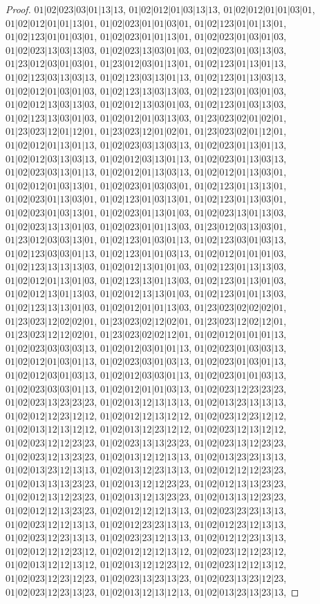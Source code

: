 \documentclass[12pt]{article}
\theoremstyle{plain}
\theoremstyle{definition}
\theoremstyle{remark}
\begin{document}
\begin{proof}
$01|02|023|03|01|13|13$, $01|02|012|01|03|13|13$, $01|02|012|01|01|03|01$, $01|02|012|01|01|13|01$, $01|02|023|01|01|03|01$, $01|02|123|01|01|13|01$, $01|02|123|01|01|03|01$, $01|02|023|01|01|13|01$, $01|02|023|01|03|01|03$, $01|02|023|13|03|13|03$, $01|02|023|13|03|01|03$, $01|02|023|01|03|13|03$, $01|23|012|03|01|03|01$, $01|23|012|03|01|13|01$, $01|02|123|01|13|01|13$, $01|02|123|03|13|03|13$, $01|02|123|03|13|01|13$, $01|02|123|01|13|03|13$, $01|02|012|01|03|01|03$, $01|02|123|13|03|13|03$, $01|02|123|01|03|01|03$, $01|02|012|13|03|13|03$, $01|02|012|13|03|01|03$, $01|02|123|01|03|13|03$, $01|02|123|13|03|01|03$, $01|02|012|01|03|13|03$, $01|23|023|02|01|02|01$, $01|23|023|12|01|12|01$, $01|23|023|12|01|02|01$, $01|23|023|02|01|12|01$, $01|02|012|01|13|01|13$, $01|02|023|03|13|03|13$, $01|02|023|01|13|01|13$, $01|02|012|03|13|03|13$, $01|02|012|03|13|01|13$, $01|02|023|01|13|03|13$, $01|02|023|03|13|01|13$, $01|02|012|01|13|03|13$, $01|02|012|01|13|03|01$, $01|02|012|01|03|13|01$, $01|02|023|01|03|03|01$, $01|02|123|01|13|13|01$, $01|02|023|01|13|03|01$, $01|02|123|01|03|13|01$, $01|02|123|01|13|03|01$, $01|02|023|01|03|13|01$, $01|02|023|01|13|01|03$, $01|02|023|13|01|13|03$, $01|02|023|13|13|01|03$, $01|02|023|01|01|13|03$, $01|23|012|03|13|03|01$, $01|23|012|03|03|13|01$, $01|02|123|01|03|01|13$, $01|02|123|03|01|03|13$, $01|02|123|03|03|01|13$, $01|02|123|01|01|03|13$, $01|02|012|01|01|01|03$, $01|02|123|13|13|13|03$, $01|02|012|13|01|01|03$, $01|02|123|01|13|13|03$, $01|02|012|01|13|01|03$, $01|02|123|13|01|13|03$, $01|02|123|01|13|01|03$, $01|02|012|13|01|13|03$, $01|02|012|13|13|01|03$, $01|02|123|01|01|13|03$, $01|02|123|13|13|01|03$, $01|02|012|01|01|13|03$, $01|23|023|02|02|02|01$, $01|23|023|12|02|02|01$, $01|23|023|02|12|02|01$, $01|23|023|12|02|12|01$, $01|23|023|12|12|02|01$, $01|23|023|02|02|12|01$, $01|02|012|01|01|01|13$, $01|02|023|03|03|03|13$, $01|02|012|03|01|01|13$, $01|02|023|01|03|03|13$, $01|02|012|01|03|01|13$, $01|02|023|03|01|03|13$, $01|02|023|01|03|01|13$, $01|02|012|03|01|03|13$, $01|02|012|03|03|01|13$, $01|02|023|01|01|03|13$, $01|02|023|03|03|01|13$, $01|02|012|01|01|03|13$, $01|02|023|12|23|23|23$, $01|02|023|13|23|23|23$, $01|02|013|12|13|13|13$, $01|02|013|23|13|13|13$, $01|02|012|12|23|12|12$, $01|02|012|12|13|12|12$, $01|02|023|12|23|12|12$, $01|02|013|12|13|12|12$, $01|02|013|12|23|12|12$, $01|02|023|12|13|12|12$, $01|02|023|12|12|23|23$, $01|02|023|13|13|23|23$, $01|02|023|13|12|23|23$, $01|02|023|12|13|23|23$, $01|02|013|12|12|13|13$, $01|02|013|23|23|13|13$, $01|02|013|23|12|13|13$, $01|02|013|12|23|13|13$, $01|02|012|12|12|23|23$, $01|02|013|13|13|23|23$, $01|02|013|12|12|23|23$, $01|02|012|13|13|23|23$, $01|02|012|13|12|23|23$, $01|02|013|12|13|23|23$, $01|02|013|13|12|23|23$, $01|02|012|12|13|23|23$, $01|02|012|12|12|13|13$, $01|02|023|23|23|13|13$, $01|02|023|12|12|13|13$, $01|02|012|23|23|13|13$, $01|02|012|23|12|13|13$, $01|02|023|12|23|13|13$, $01|02|023|23|12|13|13$, $01|02|012|12|23|13|13$, $01|02|012|12|12|23|12$, $01|02|012|12|12|13|12$, $01|02|023|12|12|23|12$, $01|02|013|12|12|13|12$, $01|02|013|12|12|23|12$, $01|02|023|12|12|13|12$, $01|02|023|12|23|12|23$, $01|02|023|13|23|13|23$, $01|02|023|13|23|12|23$, $01|02|023|12|23|13|23$, $01|02|013|12|13|12|13$, $01|02|013|23|13|23|13$, 
\end{proof}
\end{document}
